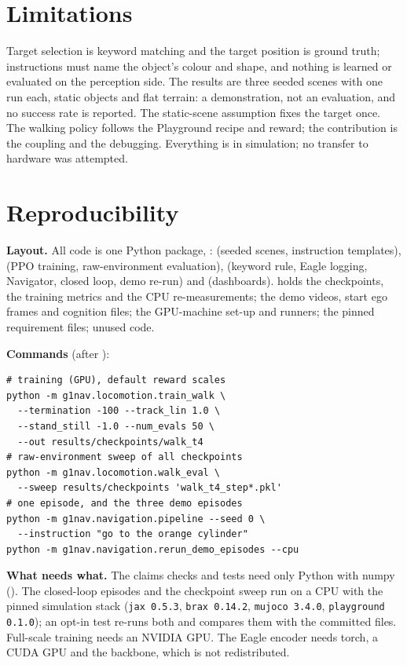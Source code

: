 \documentclass[conference,10pt]{IEEEtran}
\begin{document}
\section{Limitations}\label{sec:limits}
Target selection is keyword matching and the target position is ground truth; instructions must name the object's colour
and shape, and nothing is learned or evaluated on the perception side. The results are three seeded scenes with one
run each, static objects and flat terrain: a demonstration, not an evaluation, and no success rate is reported. The
static-scene assumption fixes the target once. The walking policy follows the Playground recipe and reward; the
contribution is the coupling and the debugging. Everything is in simulation; no transfer to hardware was attempted.

\section{Reproducibility}\label{sec:repro}
\textbf{Layout.} All code is one Python package, :  (seeded scenes, instruction templates),
 (PPO training, raw-environment evaluation),  (keyword rule, Eagle logging, Navigator,
closed loop, demo re-run) and  (dashboards).  holds the checkpoints, the training metrics and
the CPU re-measurements;  the demo videos, start ego frames and cognition files;  the
GPU-machine set-up and runners;  the pinned requirement files;  unused code.

\textbf{Commands} (after ):
{\scriptsize
\begin{verbatim}
# training (GPU), default reward scales
python -m g1nav.locomotion.train_walk \
  --termination -100 --track_lin 1.0 \
  --stand_still -1.0 --num_evals 50 \
  --out results/checkpoints/walk_t4
# raw-environment sweep of all checkpoints
python -m g1nav.locomotion.walk_eval \
  --sweep results/checkpoints 'walk_t4_step*.pkl'
# one episode, and the three demo episodes
python -m g1nav.navigation.pipeline --seed 0 \
  --instruction "go to the orange cylinder"
python -m g1nav.navigation.rerun_demo_episodes --cpu
\end{verbatim}}

\textbf{What needs what.} The claims checks and tests need only Python with numpy ().
The closed-loop episodes and the checkpoint sweep run on a CPU with the pinned simulation stack (\texttt{jax 0.5.3},
\texttt{brax 0.14.2}, \texttt{mujoco 3.4.0}, \texttt{playground 0.1.0}); an opt-in test re-runs both and compares them
with the committed files. Full-scale training needs an NVIDIA GPU. The Eagle encoder needs torch, a CUDA GPU and the
backbone, which is not redistributed.
\end{document}
